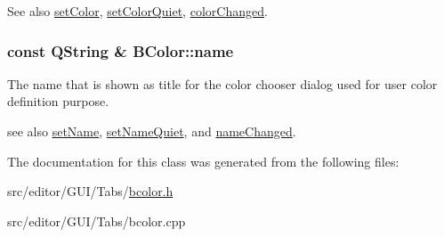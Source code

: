 \begin{DoxySeeAlso}{\-See also}
\hyperlink{class_b_color_a901e6704aef22f6db97d3578e14777c6}{set\-Color}, \hyperlink{class_b_color_a3781c2b986f19ceaac7c994767015b56}{set\-Color\-Quiet}, \hyperlink{class_b_color_a75ac94fde91e10eb6c27242f608b8d62}{color\-Changed}. 
\end{DoxySeeAlso}
\hypertarget{class_b_color_a68e6b6c8c92fe004a98b44d48ba8a42a}{
\subsubsection[{name}]{\setlength{\rightskip}{0pt plus 5cm}const \-Q\-String \& {\bf \-B\-Color\-::name}}}\label{class_b_color_a68e6b6c8c92fe004a98b44d48ba8a42a}
\-The name that is shown as title for the color chooser dialog used for user color definition purpose.

see also \hyperlink{class_b_color_abcf2d57696ada6466424663f15624cad}{set\-Name}, \hyperlink{class_b_color_ac159569b670ed175be068204a28a7be9}{set\-Name\-Quiet}, and \hyperlink{class_b_color_a5895b999f69044b919e6d5526577ad87}{name\-Changed}. 

\-The documentation for this class was generated from the following files\-:\begin{DoxyCompactItemize}
\item 
src/editor/\-G\-U\-I/\-Tabs/\hyperlink{bcolor_8h}{bcolor.\-h}\item 
src/editor/\-G\-U\-I/\-Tabs/bcolor.\-cpp\end{DoxyCompactItemize}
